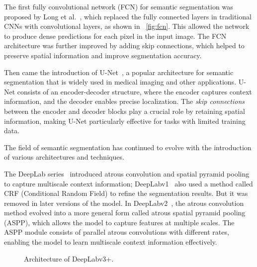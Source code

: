 The first fully convolutional network (FCN) for semantic segmentation was proposed by Long et al.~\cite{fsss_fcn}, which replaced the fully connected layers in traditional CNNs with convolutional layers, as shown in ~\autoref{fig:fcn}. This allowed the network to produce dense predictions for each pixel in the input image. The FCN architecture was further improved by adding skip connections, which helped to preserve spatial information and improve segmentation accuracy.


Then came the introduction of U-Net~\cite{fsss_unet}, a popular architecture for semantic segmentation that is widely used in medical imaging and other applications. U-Net consists of an encoder-decoder structure, where the encoder captures context information, and the decoder enables precise localization. The \emph{skip connections} between the encoder and decoder blocks play a crucial role by retaining spatial information, making U-Net particularly effective for tasks with limited training data.

The field of semantic segmentation has continued to evolve with the introduction of various architectures and techniques.

The DeepLab series~\cite{fsss_deeplabv1, fsss_deeplabv2, fsss_deeplabv3,fsss_deeplabv3plus} introduced atrous convolution and spatial pyramid pooling to capture multiscale context information; DeepLabv1~\cite{fsss_deeplabv1} also used a method called CRF (Conditional Random Field) to refine the segmentation results. But it was removed in later versions of the model. In DeepLabv2~\cite{fsss_deeplabv2}, the atrous convolution method evolved into a more general form called atrous spatial pyramid pooling (ASPP), which allows the model to capture features at multiple scales. The ASPP module consists of parallel atrous convolutions with different rates, enabling the model to learn multiscale context information effectively.

\begin{figure}[htbp]
    \centering
    \caption{Architecture of DeepLabv3+.}
    \label{fig:dlv3+}
\end{figure}

